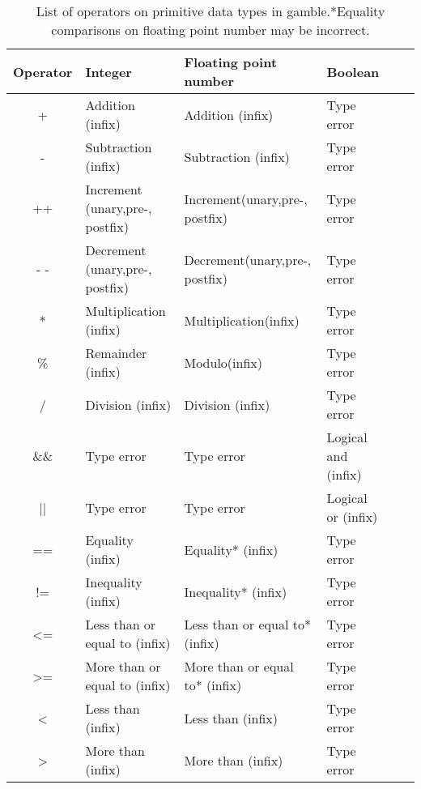 \begin{table}[h]
    \centering
    \begin{tabular}{|c|l|l|l|l|l|}
    \hline
    \textbf{Operator}  & \textbf{Integer}                   & \textbf{Floating point number}    & \textbf{Boolean}       \\ \hline
    +                  & Addition (infix)                   & Addition (infix)                  & Type error             \\ \hline 
    -                  & Subtraction (infix)                & Subtraction (infix)               & Type error             \\ \hline 
    ++                 & Increment (unary,pre-, postfix)    & Increment(unary,pre-, postfix)    & Type error             \\ \hline    
    - -                  & Decrement (unary,pre-, postfix)    & Decrement(unary,pre-, postfix)    & Type error             \\ \hline
    *                  & Multiplication (infix)             & Multiplication(infix)             & Type error             \\ \hline
    \%                 & Remainder (infix)                  & Modulo(infix)                     & Type error             \\ \hline
    /                  & Division (infix)                   & Division (infix)                  & Type error             \\ \hline
    \&\&               & Type error                         & Type error                        & Logical and (infix)    \\ \hline 
    ||                 & Type error                         & Type error                        & Logical or (infix)     \\ \hline 
    ==                 & Equality (infix)                   & Equality* (infix)                 & Type error             \\ \hline 
    !=                 & Inequality (infix)                 & Inequality* (infix)               & Type error             \\ \hline
    <=                 & Less than or equal to (infix)      & Less than or equal to* (infix)    & Type error             \\ \hline
    >=                 & More than or equal to (infix)      & More than or equal to* (infix)    & Type error             \\ \hline
    <                  & Less than (infix)                  & Less than (infix)                 & Type error             \\ \hline
    >                  & More than (infix)                  & More than (infix)                 & Type error             \\ \hline
    \end{tabular}
    \caption[List of operators on primitive data types in \gls{gamble}.]{List of operators on primitive data types in \gls{gamble}.\@*Equality comparisons on floating point number may be incorrect.}\label{tbl:operators}
\end{table}

